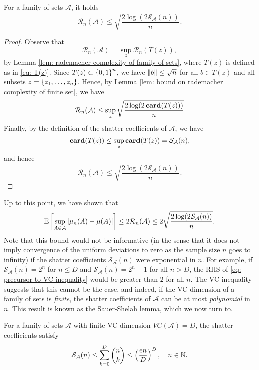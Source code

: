 \begin{proposition}
\label{prop: bound on rademacher complexity of family of sets}
For a family of sets $\mathcal{A}$, it holds
\[
    \mathcal{R}_n(\mathcal{A}) \leq \sqrt{ \frac{2 \log(2 \mathcal{S}_{\mathcal{A}}(n)) }{n} }.
\]
\end{proposition}

\begin{proof}
Observe that
\[
    \mathcal{R}_n(\mathcal{A}) = \sup_z \mathcal{R}_n(T(z)),
\]
by Lemma \ref{lem: rademacher complexity of family of sets}, where $T(z)$ is defined as in \eqref{eq: T(z)}. Since $T(z) \subset \left\{0, 1\right\}^n$, we have $\norm{b} \leq \sqrt{n}$ for all $b \in T(z)$ and all subsets $z = \left\{z_1, \dots, z_n\right\}$. Hence, by Lemma \ref{lem: bound on rademacher complexity of finite set}, we have
\[
    \mathcal{R}_n(\mathcal{A}) \leq \sup_z \sqrt{\frac{2 \log(2 \, \mathrm{\mathbf{card}}(T(z)))}{n}}
\]
Finally, by the definition of the shatter coefficients of $\mathcal{A}$, we have
\[
    \mathrm{\mathbf{card}}(T(z)) \leq \sup_z \mathrm{\mathbf{card}}(T(z)) = \mathcal{S}_{\mathcal{A}}(n),
\]
and hence
\[
    \mathcal{R}_n(\mathcal{A}) \leq \sqrt{ \frac{2 \log(2 \mathcal{S}_{\mathcal{A}}(n)) }{n} }.
\]
\end{proof}

Up to this point, we have shown that
\begin{equation}
\label{eq: precursor to VC inequality}
    \mathbb{E}\left[ \sup_{A \in \mathcal{A}} \abs{\mu_n(A) - \mu(A)} \right] \leq 2 \mathcal{R}_n(\mathcal{A}) \leq 2 \sqrt{ \frac{2 \log(2 \mathcal{S}_{\mathcal{A}}(n)) }{n} }.
\end{equation}
Note that this bound would not be informative (in the sense that it does not imply convergence of the uniform deviations to zero as the sample size $n$ goes to infinity) if the shatter coefficients $\mathcal{S}_{\mathcal{A}}(n)$ were exponential in $n$. For example, if $\mathcal{S}_{\mathcal{A}}(n) = 2^n$ for $n \leq D$ and $\mathcal{S}_{\mathcal{A}}(n) = 2^n - 1$ for all $n > D$, the RHS of \eqref{eq: precursor to VC inequality} would be greater than $2$ for all $n$. The VC inequality suggests that this cannot be the case, and indeed, if the VC dimension of a family of sets is \emph{finite}, the shatter coefficients of $\mathcal{A}$ can be at most \emph{polynomial} in $n$. This result is known as the Sauer-Shelah lemma, which we now turn to.

\begin{lemma}
For a family of sets $\mathcal{A}$ with finite VC dimension $VC(\mathcal{A}) = D$, the shatter coefficients satisfy
\[
    \mathcal{S}_{\mathcal{A}}(n) \leq \sum_{k=0}^D \binom{n}{k} \leq \left( \frac{\mathrm{e} n}{D} \right)^D, \quad n \in \mathbb{N}.
\]
\end{lemma}

